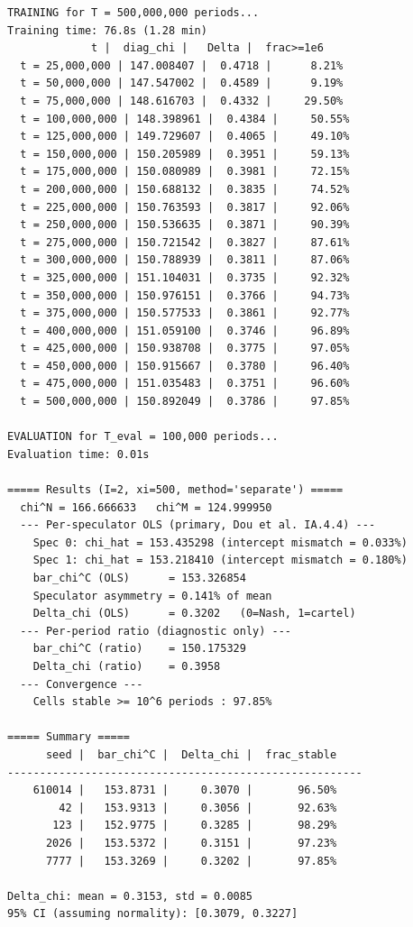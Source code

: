\begin{lstlisting}[style=outputstyle]
TRAINING for T = 500,000,000 periods...
Training time: 76.8s (1.28 min)
             t |  diag_chi |   Delta |  frac>=1e6
  t = 25,000,000 | 147.008407 |  0.4718 |      8.21%
  t = 50,000,000 | 147.547002 |  0.4589 |      9.19%
  t = 75,000,000 | 148.616703 |  0.4332 |     29.50%
  t = 100,000,000 | 148.398961 |  0.4384 |     50.55%
  t = 125,000,000 | 149.729607 |  0.4065 |     49.10%
  t = 150,000,000 | 150.205989 |  0.3951 |     59.13%
  t = 175,000,000 | 150.080989 |  0.3981 |     72.15%
  t = 200,000,000 | 150.688132 |  0.3835 |     74.52%
  t = 225,000,000 | 150.763593 |  0.3817 |     92.06%
  t = 250,000,000 | 150.536635 |  0.3871 |     90.39%
  t = 275,000,000 | 150.721542 |  0.3827 |     87.61%
  t = 300,000,000 | 150.788939 |  0.3811 |     87.06%
  t = 325,000,000 | 151.104031 |  0.3735 |     92.32%
  t = 350,000,000 | 150.976151 |  0.3766 |     94.73%
  t = 375,000,000 | 150.577533 |  0.3861 |     92.77%
  t = 400,000,000 | 151.059100 |  0.3746 |     96.89%
  t = 425,000,000 | 150.938708 |  0.3775 |     97.05%
  t = 450,000,000 | 150.915667 |  0.3780 |     96.40%
  t = 475,000,000 | 151.035483 |  0.3751 |     96.60%
  t = 500,000,000 | 150.892049 |  0.3786 |     97.85%

EVALUATION for T_eval = 100,000 periods...
Evaluation time: 0.01s

===== Results (I=2, xi=500, method='separate') =====
  chi^N = 166.666633   chi^M = 124.999950
  --- Per-speculator OLS (primary, Dou et al. IA.4.4) ---
    Spec 0: chi_hat = 153.435298 (intercept mismatch = 0.033%)
    Spec 1: chi_hat = 153.218410 (intercept mismatch = 0.180%)
    bar_chi^C (OLS)      = 153.326854
    Speculator asymmetry = 0.141% of mean
    Delta_chi (OLS)      = 0.3202   (0=Nash, 1=cartel)
  --- Per-period ratio (diagnostic only) ---
    bar_chi^C (ratio)    = 150.175329
    Delta_chi (ratio)    = 0.3958
  --- Convergence ---
    Cells stable >= 10^6 periods : 97.85%

===== Summary =====
      seed |  bar_chi^C |  Delta_chi |  frac_stable
-------------------------------------------------------
    610014 |   153.8731 |     0.3070 |       96.50%
        42 |   153.9313 |     0.3056 |       92.63%
       123 |   152.9775 |     0.3285 |       98.29%
      2026 |   153.5372 |     0.3151 |       97.23%
      7777 |   153.3269 |     0.3202 |       97.85%

Delta_chi: mean = 0.3153, std = 0.0085
95% CI (assuming normality): [0.3079, 0.3227]
\end{lstlisting}

